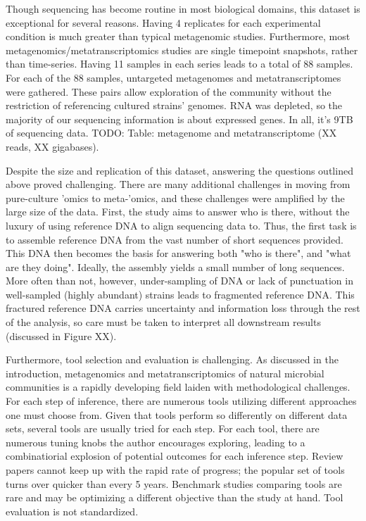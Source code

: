 Though sequencing has become routine in most biological domains, this dataset is exceptional for several reasons.
Having 4 replicates for each experimental condition is much greater than typical metagenomic studies.
Furthermore, most metagenomics/metatranscriptomics studies are single timepoint snapshots, rather than time-series.
Having 11 samples in each series leads to a total of 88 samples.
For each of the 88 samples, untargeted metagenomes and metatranscriptomes were gathered.
These pairs allow exploration of the community without the restriction of referencing cultured strains' genomes.
RNA was depleted, so the majority of our sequencing information is about expressed genes.
In all, it's 9TB of sequencing data.  TODO: Table: metagenome and metatranscriptome (XX reads, XX gigabases).


Despite the size and replication of this dataset, answering the questions outlined above proved challenging.
There are many additional challenges in moving from pure-culture 'omics to meta-'omics, and these challenges were amplified by the large size of the data.
First, the study aims to answer who is there, without the luxury of using reference DNA to align sequencing data to.
Thus, the first task is to assemble reference DNA from the vast number of short sequences provided.
This DNA then becomes the basis for answering both "who is there", and "what are they doing".
Ideally, the assembly yields a small number of long sequences.
More often than not, however, under-sampling of DNA or lack of punctuation in well-sampled (highly abundant) strains leads to fragmented reference DNA.
This fractured reference DNA carries uncertainty and information loss through the rest of the analysis, so care must be taken to interpret all downstream results (discussed in Figure XX).

Furthermore, tool selection and evaluation is challenging.
As discussed in the introduction, metagenomics and metatranscriptomics of natural microbial communities is a rapidly developing field laiden with methodological challenges.
For each step of inference, there are numerous tools utilizing different approaches one must choose from.
Given that tools perform so differently on different data sets, several tools are usually tried for each step.
For each tool, there are numerous tuning knobs the author encourages exploring, leading to a combinatiorial explosion of potential outcomes for each inference step.
Review papers cannot keep up with the rapid rate of progress; the popular set of tools turns over quicker than every 5 years.
Benchmark studies comparing tools are rare and may be optimizing a different objective than the study at hand.
Tool evaluation is not standardized.


